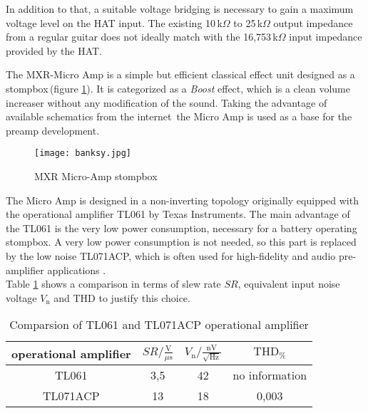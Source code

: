 In addition to that, a suitable voltage bridging is necessary to gain a maximum voltage level on the HAT input. The existing 10\,k$\Omega$ to 25\,k$\Omega$ output impedance from a regular guitar does not ideally match with the 16,753\,k$\Omega$ \cite[p.\,50]{Albers:2017} input impedance provided by the HAT.



The MXR-Micro Amp is a simple but efficient classical effect unit designed as a stompbox\,(figure \ref{fig:MicroAmp}).
It is categorized  as a \textit{Boost} effect, which is a clean volume increaser without any modification of the sound. Taking the advantage of available schematics from the internet\,\cite{ElectroSmash:2017} the Micro Amp is used as a base for the preamp development.

\begin{figure}[H]
	\centering \texttt{[image: banksy.jpg]}
	\caption[MicroAmp]{MXR Micro-Amp stompbox\footnotemark}
	\label{fig:MicroAmp}
\end{figure} 

The Micro Amp is designed in a non-inverting topology originally equipped with the operational amplifier TL061 \cite{Tl061:2015} by Texas Instruments. The main advantage of the TL061 is the very low power consumption, necessary for a battery operating stompbox.
A very low power consumption is not needed, so this part is replaced by the low noise TL071ACP, which is often used for high-fidelity  and audio pre-amplifier applications \cite{Tl071:2017}.\\
Table \ref{tab:OPAmpvergleich} shows a comparison in terms of slew rate $SR$, equivalent input 
noise voltage $V_\mathrm{n}$ and THD to justify this choice.


\begin{table}[H]
\begin{center}
\begin{tabular}{|c|c|c|c|}
\hline 
\textbf{operational amplifier} & \textbf{$SR/ \frac{\mathrm{V}}{\mu \mathrm{s}}$} & $V_\mathrm{n} / \frac{\mathrm{nV}}{\sqrt{\mathrm{Hz}}}$ &\textbf{$\mathrm{THD}_{\%}$} \\ 
\hline 
\hline
TL061 & 3,5 & 42 & no information \\ 
\hline 
TL071ACP & 13 & 18 & 0,003 \\ 
\hline 
\end{tabular}
\caption{Comparsion of TL061 and TL071ACP operational amplifier}
\end{center}
\label{tab:OPAmpvergleich}
\end{table}

